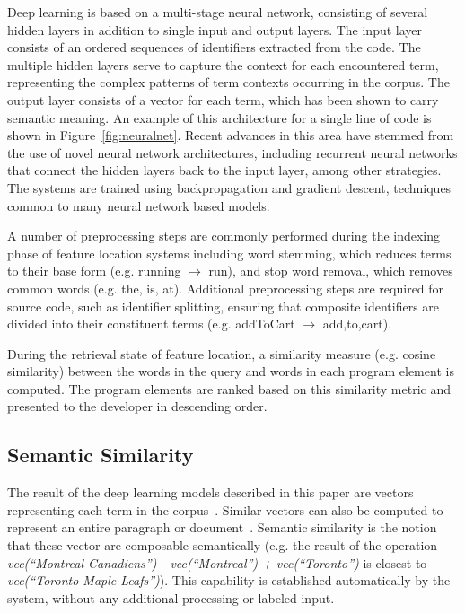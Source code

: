 Deep learning is based on a multi-stage neural network, consisting of
several hidden layers in addition to single input and output layers.
The input layer consists of an ordered sequences of identifiers
extracted from the code. The multiple hidden layers serve to capture
the context for each encountered term, representing the complex
patterns of term contexts occurring in the corpus. The output layer
consists of a vector for each term, which has been shown to carry
semantic meaning. An example of this architecture for a single line of
code is shown in Figure~\ref{fig:neuralnet}. Recent advances in this
area have stemmed from the use of novel neural network architectures,
including recurrent neural networks that connect the hidden layers
back to the input layer, among other strategies. The systems are
trained using backpropagation and gradient descent, techniques common
to many neural network based models.

 
A number of preprocessing steps are commonly performed during the
indexing phase of feature location systems including word stemming,
which reduces terms to their base form (e.g. running $\rightarrow$
run), and stop word removal, which removes common words (e.g. the, is,
at). Additional preprocessing steps are required for source code, such
as identifier splitting, ensuring that composite identifiers are
divided into their constituent terms (e.g. addToCart $\rightarrow$
add,to,cart). 


During the retrieval state of feature location, a similarity measure
(e.g. cosine similarity) between the words in the query and words in
each program element is computed. The program elements are ranked
based on this similarity metric and presented to the developer in
descending order.


\subsection{Semantic Similarity}

The result of the deep learning models described in this paper are
vectors representing each term in the
corpus~\cite{mikolov_distributed_2013}. Similar vectors can also be
computed to represent an entire paragraph or
document~\cite{le_distributed_2014}.  Semantic similarity is the
notion that these vector are composable semantically (e.g. the result
of the operation {\em vec(``Montreal Canadiens'') - vec(``Montreal'') +
vec(``Toronto'')} is closest to {\em vec(``Toronto Maple Leafs'')}). This
capability is established automatically by the system, without any
additional processing or labeled input.

